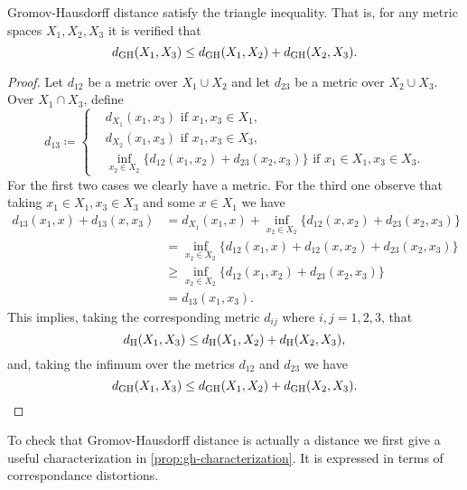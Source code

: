 \begin{lemma} \label{lemma:gh-triangle}
    Gromov-Hausdorff distance satisfy the triangle inequality. That is, for any metric spaces $ X_1, X_2, X_3 $ it is verified that
    \begin{equation}
        d_{\operatorname{GH}}(X_1, X_3) \leq d_{\operatorname{GH}}(X_1, X_2) + d_{\operatorname{GH}}(X_2, X_3).
    \end{equation}
\end{lemma}
\begin{proof}
    Let $ d_{12} $ be a metric over $ X_1 \cup X_2 $ and let $ d_{23} $ be a metric over $ X_2 \cup X_3 $. Over $ X_1 \cap X_3 $, define
    \begin{equation}
        d_{13} \coloneq \begin{cases}
        &d_{X_1}(x_1, x_3) \text{ if } x_1, x_3 \in X_1, \\
        &d_{X_2}(x_1, x_3) \text{ if } x_1, x_3 \in X_3, \\
        &\inf_{x_2 \in X_2} \{d_{12}(x_1, x_2) + d_{23}(x_2, x_3)\} \text{ if } x_1 \in X_1, x_3 \in X_3.
        \end{cases}
    \end{equation}
    For the first two cases we clearly have a metric. For the third one observe that taking $ x_1 \in X_1, x_3 \in X_3 $ and some $ x \in X_1 $ we have
    \begin{align}
        d_{13}(x_1, x) + d_{13}(x, x_3) &= d_{X_1}(x_1, x) + \inf_{x_2 \in X_2} \{d_{12}(x, x_2) + d_{23}(x_2, x_3)\} \\
        &= \inf_{x_2 \in X_2} \{d_{12}(x_1, x) + d_{12}(x, x_2) + d_{23}(x_2, x_3)\} \\
        &\geq \inf_{x_2 \in X_2} \{d_{12}(x_1, x_2) + d_{23}(x_2, x_3)\} \\
        &= d_{13}(x_1, x_3).
    \end{align}
    This implies, taking the corresponding metric $ d_{ij} $ where $ i, j = 1, 2, 3$, that 
    \begin{equation}
        d_{\operatorname{H}}(X_1, X_3) \leq d_{\operatorname{H}}(X_1, X_2) + d_{\operatorname{H}}(X_2, X_3),
    \end{equation}
    and, taking the infimum over the metrics $ d_{12} $ and $ d_{23} $ we have
    \begin{equation}
        d_{\operatorname{GH}}(X_1, X_3) \leq d_{\operatorname{GH}}(X_1, X_2) + d_{\operatorname{GH}}(X_2, X_3).
    \end{equation}
\end{proof}

To check that Gromov-Hausdorff distance is actually a distance we first give a useful characterization in \ref{prop:gh-characterization}. It is expressed in terms of correspondance distortions.

